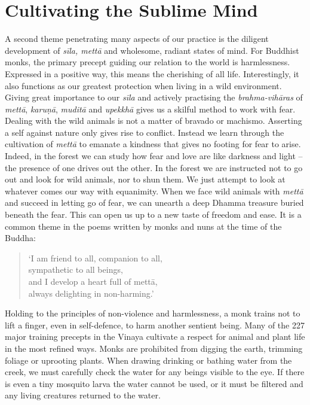 \section{Cultivating the Sublime Mind}

A second theme penetrating many aspects of our practice is the diligent
development of \emph{sīla, mettā} and wholesome, radiant states of mind. 
For Buddhist monks, the primary precept guiding our relation to the
world is harmlessness. Expressed in a positive way, this means the
cherishing of all life. Interestingly, it also functions as our greatest
protection when living in a wild environment. Giving great importance to
our \emph{sīla} and actively practising the \emph{brahma-vihāras} of
\emph{mettā}, \emph{karuṇā}, \emph{muditā} and \emph{upekkhā} gives us
a skilful method to work with fear. Dealing with the wild animals is not
a matter of bravado or machismo. Asserting a self against nature only
gives rise to conflict. Instead we learn through the cultivation of
\emph{mettā} to emanate a kindness that gives no footing for fear to
arise. Indeed, in the forest we can study how fear and love are like
darkness and light -- the presence of one drives out the other. In the
forest we are instructed not to go out and look for wild animals, nor to
shun them. We just attempt to look at whatever comes our way with
equanimity. When we face wild animals with \emph{mettā} and succeed in
letting go of fear, we can unearth a deep Dhamma treasure buried beneath
the fear. This can open us up to a new taste of freedom and ease. It is
a common theme in the poems written by monks and nuns at the time of the
Buddha: 

\begin{quote}
`I am friend to all, companion to all,\\
sympathetic to all beings,\\
and I develop a heart full of mettā,\\
always delighting in non-harming.'
%
\end{quote}

Holding to the principles of non-violence and harmlessness, a monk trains
not to lift a finger, even in self-defence, to harm another sentient
being. Many of the 227 major training precepts in the Vinaya cultivate a
respect for animal and plant life in the most refined ways. Monks are
prohibited from digging the earth, trimming foliage or uprooting plants. 
When drawing drinking or bathing water from the creek, we must carefully
check the water for any beings visible to the eye. If there is even a
tiny mosquito larva the water cannot be used, or it must be filtered and
any living creatures returned to the water. 

